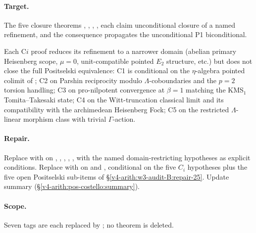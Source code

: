 \paragraph{Target.} The five closure theorems
,
,
,
,
 each claim unconditional
closure of a named refinement, and the consequence
 propagates the
unconditional P1 biconditional.

Each C\(i\) proof reduces its refinement to a narrower domain (abelian
primary Heisenberg scope, \(\mu=0\), unit-compatible pointed \(E_{2}\)
structure, etc.) but does not close the full Positselski equivalence:
C1 is conditional on the \(\eta\)-algebra pointed colimit of
; C2 on Parshin reciprocity
modulo \(\Lambda\)-coboundaries and the \(p=2\) torsion handling; C3
on pro-nilpotent convergence at \(\beta=1\) matching the KMS\(_{1}\)
Tomita--Takesaki state; C4 on the Witt-truncation classical limit
and its compatibility with the archimedean Heisenberg Fock; C5 on
the restricted \(\Lambda\)-linear morphism class with trivial
\(\Gamma\)-action.

\paragraph{Repair.} Replace \ClaimStatusProvedHere{} with
\ClaimStatusProvedHereConditional{} on
,
,
,
,
, with the named
domain-restricting hypotheses as explicit conditions. Replace
\ClaimStatusProvedHere{} with \ClaimStatusProvedHereConditional{}
on  and
, conditional on
the five \(C_i\) hypotheses plus the five open Positselski sub-items
of \S\ref{v4-arith:w3-audit-B:repair-25}. Update summary
(\S\ref{v4-arith:pos-costello:summary}).

\paragraph{Scope.} Seven \ClaimStatusProvedHere{} tags are each
replaced by \ClaimStatusProvedHereConditional{}; no theorem is
deleted.

